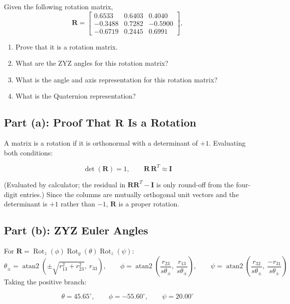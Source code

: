 \documentclass[11pt]{article}
\newcommand{\R}{\bm{R}}
\newcommand{\Roty}{\operatorname{Rot}_y}
\newcommand{\Rotz}{\operatorname{Rot}_z}
\newcommand{\atantwo}{\operatorname{atan2}}
\begin{document}
\begin{statement}
Given the following rotation matrix,
\[
    \R = \begin{bmatrix}
        0.6533 & 0.6403 & 0.4040\\
        -0.3488 & 0.7282 & -0.5900\\
        -0.6719 & 0.2445 & 0.6991
    \end{bmatrix},
\]
\begin{enumerate}[label=(\alph*), leftmargin=1.6em, itemsep=2pt]
    \item Prove that it is a rotation matrix.
    \item What are the ZYZ angles for this rotation matrix?
    \item What is the angle and axis representation for this rotation matrix?
    \item What is the Quaternion representation?
\end{enumerate}
\end{statement}

\subsection*{Part (a): Proof That $\R$ Is a Rotation}
A matrix is a rotation if it is orthonormal with a determinant of $+1$. Evaluating both conditions:
\begin{result}
\[
    \det(\R) = 1, \qquad \R\,\R^{T} \approx \bm I
\]
\end{result}
(Evaluated by calculator; the residual in $\R\R^{T}-\bm I$ is only round-off from the four-digit entries.) Since the columns are mutually orthogonal unit vectors and the determinant is $+1$ rather than $-1$, $\R$ is a proper rotation.

\subsection*{Part (b): ZYZ Euler Angles}
For $\R = \Rotz(\phi)\Roty(\theta)\Rotz(\psi)$:
\[
    \theta_{\pm} = \atantwo\!\left(\pm\sqrt{r_{13}^{2}+r_{23}^{2}},\ r_{33}\right), \qquad
    \phi = \atantwo\!\left(\frac{r_{23}}{s\theta_{\pm}},\ \frac{r_{13}}{s\theta_{\pm}}\right), \qquad
    \psi = \atantwo\!\left(\frac{r_{32}}{s\theta_{\pm}},\ \frac{-r_{31}}{s\theta_{\pm}}\right)
\]
Taking the positive branch:
\begin{result}
\[
    \theta = 45.65^\circ, \qquad \phi = -55.60^\circ, \qquad \psi = 20.00^\circ
\]
\end{result}
\end{document}
